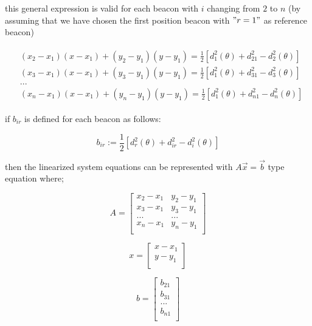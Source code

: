 this general expression is valid for each beacon with $i$ changing from $2$ to $n$ (by assuming that we have chosen the first position beacon with $"r=1"$ as reference beacon)

\begin{align}
\begin{split}
& (x_2 - x_1)(x - x_1) + (y_2 - y_1)(y - y_1) = \frac{1}{2} [d_1^2(\theta) + d_{21}^2 - d_2^2(\theta)] \\
& (x_3 - x_1)(x - x_1) + (y_3 - y_1)(y - y_1) = \frac{1}{2} [d_1^2(\theta) + d_{31}^2 - d_3^2(\theta)] \\
& ... \\
& (x_n - x_1)(x - x_1) + (y_n - y_1)(y - y_1) = \frac{1}{2} [d_1^2(\theta) + d_{n1}^2 - d_n^2(\theta)]
\end{split}
\end{align}

if $b_{ir}$ is defined for each beacon as follows:

\begin{equation}
b_{ir} := \frac{1}{2}[d_r^2(\theta) + d_{ir}^2 - d_i^2(\theta)]
\end{equation}

then the linearized system equations can be represented with $A\vec{x} = \vec{b}$ type equation where;

\begin{equation}
A = \begin{bmatrix}
x_2 - x_1 & y_2 - y_1\\
x_3 - x_1 & y_3 - y_1\\
...       & ...      \\
x_n - x_1 & y_n - y_1\\
\end{bmatrix}				
\end{equation}

\begin{equation}
x = \begin{bmatrix}
x - x_1\\
y - y_1\\
\end{bmatrix}
\end{equation}

\begin{equation}
b = \begin{bmatrix}
b_{21}\\
b_{31}\\
... \\
b_{n1}\\
\end{bmatrix}
\end{equation}

